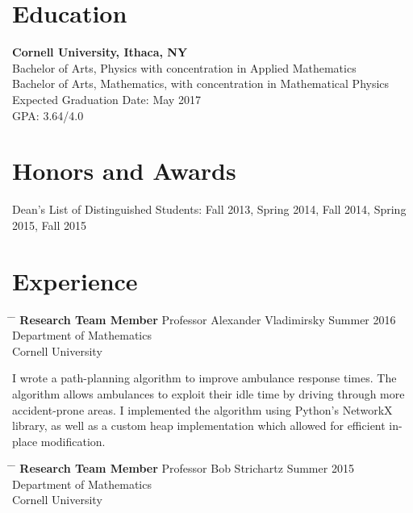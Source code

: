 \documentclass[12pt]{res}
\begin{document}
\begin{resume}
  \section{Education}

	\noindent
    {\bf Cornell University, Ithaca, NY}\\
    Bachelor of Arts, Physics with concentration in Applied Mathematics\\
    Bachelor of Arts, Mathematics, with concentration in Mathematical Physics\\
    Expected Graduation Date: May 2017 \\
    GPA: 3.64/4.0

  \section{Honors and Awards}
	\noindent
    Dean's List of Distinguished Students: Fall 2013, Spring 2014, Fall 2014, Spring 2015, Fall 2015\\

  \vspace{-10pt}
  \section{Experience}
    
    \vspace{5pt}
    \begin{tabbing}
      \hspace{2.3in} \= \hspace{2.6in} \= \kill
      {\bf Research Team Member} \> Professor Alexander Vladimirsky  \> Summer 2016 \\
		\> Department of Mathematics\\
		\> Cornell University \\
    \end{tabbing}\vspace{-30pt}	

	\noindent
	I wrote a path-planning algorithm to improve ambulance response times.
	The algorithm allows ambulances to exploit their idle time by
driving through more accident-prone areas.
	I implemented the algorithm using Python's NetworkX library,
as well as a custom heap implementation which allowed for
efficient in-place modification.
    
    \vspace{5pt}
    \begin{tabbing}
      \hspace{2.3in} \= \hspace{2.6in} \= \kill
      {\bf Research Team Member} \> Professor Bob Strichartz  \> Summer 2015 \\
		\> Department of Mathematics\\
		\> Cornell University \\
    \end{tabbing}\vspace{-30pt}	


\end{resume}
\end{document}
